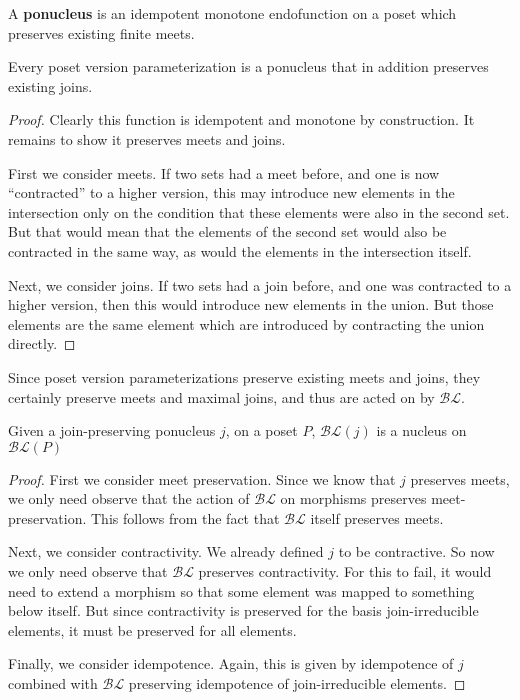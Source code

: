 \documentclass[a4paper,USenglish,cleveref, autoref, thm-restate,authorcolumns]{lipics-v2019}
\newcommand{\BLc}{\mathcal{BL}}
\begin{document}
\begin{definition}
A \textbf{ponucleus} is an idempotent monotone endofunction on a poset which preserves existing finite meets.
\end{definition}

\begin{lemma}
Every poset version parameterization is a ponucleus that in addition preserves existing joins.
\end{lemma}

\begin{proof}
Clearly this function is idempotent and monotone by construction. It remains to show it preserves meets and joins.

First we consider meets. If two sets had a meet before, and one is now ``contracted'' to a higher version, this may introduce new elements in the intersection only on the condition that these elements were also in the second set. But that would mean that the elements of the second set would also be contracted in the same way, as would the elements in the intersection itself.

Next, we consider joins. If two sets had a join before, and one was contracted to a higher version, then this would introduce new elements in the union. But those elements are the same element which are introduced by contracting the union directly.
\end{proof}

Since poset version parameterizations preserve existing meets and joins, they certainly preserve meets and maximal joins, and thus are acted on by \(\BLc\).

\begin{theorem}
Given a join-preserving ponucleus \(j\), on a poset \(P\),  \(\BLc(j)\) is a nucleus on \(\BLc(P)\)
\end{theorem}
\begin{proof}
First we consider meet preservation. Since we know that \(j\) preserves meets, we only need observe that the action of \(\BLc\) on morphisms preserves meet-preservation. This follows from the fact that \(\BLc\) itself preserves meets.

Next, we consider contractivity. We already defined \(j\) to be contractive. So now we only need observe that \(\BLc\) preserves contractivity. For this to fail, it would need to extend a morphism so that some element was mapped to something below itself. But since contractivity is preserved for the basis join-irreducible elements, it must be preserved for all elements.

Finally, we consider idempotence. Again, this is given by idempotence of \(j\) combined with \(\BLc\) preserving idempotence of join-irreducible elements.
\end{proof}
\end{document}
